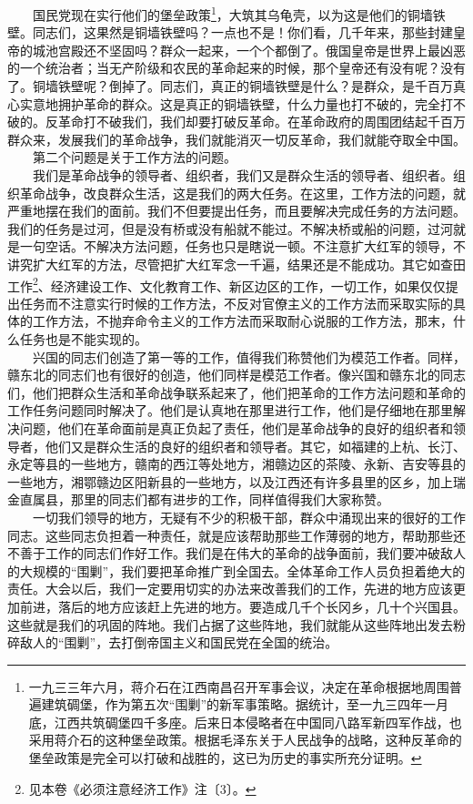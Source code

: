 \documentclass[cn,11pt,chinese]{elegantbook}
\begin{document}
　　国民党现在实行他们的堡垒政策\footnote[5]{ 一九三三年六月，蒋介石在江西南昌召开军事会议，决定在革命根据地周围普遍建筑碉堡，作为第五次“围剿”的新军事策略。据统计，至一九三四年一月底，江西共筑碉堡四千多座。后来日本侵略者在中国同八路军新四军作战，也采用蒋介石的这种堡垒政策。根据毛泽东关于人民战争的战略，这种反革命的堡垒政策是完全可以打破和战胜的，这已为历史的事实所充分证明。}，大筑其乌龟壳，以为这是他们的铜墙铁壁。同志们，这果然是铜墙铁壁吗？一点也不是！你们看，几千年来，那些封建皇帝的城池宫殿还不坚固吗？群众一起来，一个个都倒了。俄国皇帝是世界上最凶恶的一个统治者；当无产阶级和农民的革命起来的时候，那个皇帝还有没有呢？没有了。铜墙铁壁呢？倒掉了。同志们，真正的铜墙铁壁是什么？是群众，是千百万真心实意地拥护革命的群众。这是真正的铜墙铁壁，什么力量也打不破的，完全打不破的。反革命打不破我们，我们却要打破反革命。在革命政府的周围团结起千百万群众来，发展我们的革命战争，我们就能消灭一切反革命，我们就能夺取全中国。\\
　　第二个问题是关于工作方法的问题。\\
　　我们是革命战争的领导者、组织者，我们又是群众生活的领导者、组织者。组织革命战争，改良群众生活，这是我们的两大任务。在这里，工作方法的问题，就严重地摆在我们的面前。我们不但要提出任务，而且要解决完成任务的方法问题。我们的任务是过河，但是没有桥或没有船就不能过。不解决桥或船的问题，过河就是一句空话。不解决方法问题，任务也只是瞎说一顿。不注意扩大红军的领导，不讲究扩大红军的方法，尽管把扩大红军念一千遍，结果还是不能成功。其它如查田工作\footnote[6]{ 见本卷《必须注意经济工作》注〔3〕。}、经济建设工作、文化教育工作、新区边区的工作，一切工作，如果仅仅提出任务而不注意实行时候的工作方法，不反对官僚主义的工作方法而采取实际的具体的工作方法，不抛弃命令主义的工作方法而采取耐心说服的工作方法，那末，什么任务也是不能实现的。\\
　　兴国的同志们创造了第一等的工作，值得我们称赞他们为模范工作者。同样，赣东北的同志们也有很好的创造，他们同样是模范工作者。像兴国和赣东北的同志们，他们把群众生活和革命战争联系起来了，他们把革命的工作方法问题和革命的工作任务问题同时解决了。他们是认真地在那里进行工作，他们是仔细地在那里解决问题，他们在革命面前是真正负起了责任，他们是革命战争的良好的组织者和领导者，他们又是群众生活的良好的组织者和领导者。其它，如福建的上杭、长汀、永定等县的一些地方，赣南的西江等处地方，湘赣边区的茶陵、永新、吉安等县的一些地方，湘鄂赣边区阳新县的一些地方，以及江西还有许多县里的区乡，加上瑞金直属县，那里的同志们都有进步的工作，同样值得我们大家称赞。\\
　　一切我们领导的地方，无疑有不少的积极干部，群众中涌现出来的很好的工作同志。这些同志负担着一种责任，就是应该帮助那些工作薄弱的地方，帮助那些还不善于工作的同志们作好工作。我们是在伟大的革命的战争面前，我们要冲破敌人的大规模的“围剿”，我们要把革命推广到全国去。全体革命工作人员负担着绝大的责任。大会以后，我们一定要用切实的办法来改善我们的工作，先进的地方应该更加前进，落后的地方应该赶上先进的地方。要造成几千个长冈乡，几十个兴国县。这些就是我们的巩固的阵地。我们占据了这些阵地，我们就能从这些阵地出发去粉碎敌人的“围剿”，去打倒帝国主义和国民党在全国的统治。\\
\end{document}
